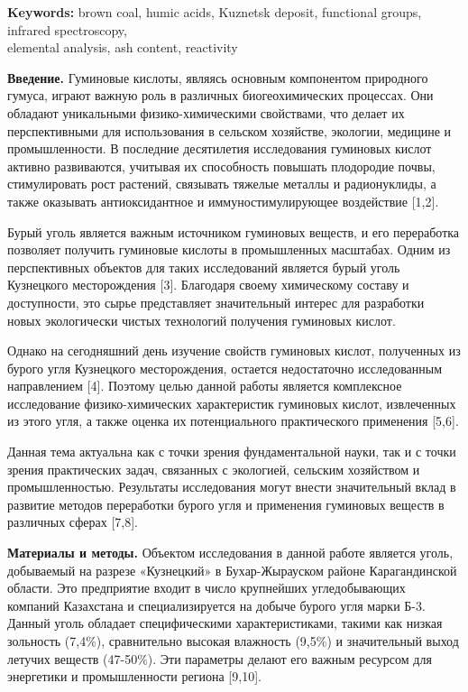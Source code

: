 {\bfseries Keywords:} brown coal, humic acids, Kuznetsk deposit, functional
groups, infrared spectroscopy, \\elemental analysis, ash content,
reactivity

\begin{multicols}{2}
{\bfseries Введение.} Гуминовые кислоты, являясь основным компонентом
природного гумуса, играют важную роль в различных биогеохимических
процессах. Они обладают уникальными физико-химическими свойствами, что
делает их перспективными для использования в сельском хозяйстве,
экологии, медицине и промышленности. В последние десятилетия
исследования гуминовых кислот активно развиваются, учитывая их
способность повышать плодородие почвы, стимулировать рост растений,
связывать тяжелые металлы и радионуклиды, а также оказывать
антиоксидантное и иммуностимулирующее воздействие {[}1,2{]}.

Бурый уголь является важным источником гуминовых веществ, и его
переработка позволяет получить гуминовые кислоты в промышленных
масштабах. Одним из перспективных объектов для таких исследований
является бурый уголь Кузнецкого месторождения {[}3{]}. Благодаря своему
химическому составу и доступности, это сырье представляет значительный
интерес для разработки новых экологически чистых технологий получения
гуминовых кислот.

Однако на сегодняшний день изучение свойств гуминовых кислот, полученных
из бурого угля Кузнецкого месторождения, остается недостаточно
исследованным направлением {[}4{]}. Поэтому целью данной работы является
комплексное исследование физико-химических характеристик гуминовых
кислот, извлеченных из этого угля, а также оценка их потенциального
практического применения {[}5,6{]}.

Данная тема актуальна как с точки зрения фундаментальной науки, так и с
точки зрения практических задач, связанных с экологией, сельским
хозяйством и промышленностью. Результаты исследования могут внести
значительный вклад в развитие методов переработки бурого угля и
применения гуминовых веществ в различных сферах {[}7,8{]}.

{\bfseries Материалы и методы.} Объектом исследования в данной работе
является уголь, добываемый на разрезе «Кузнецкий» в Бухар-Жырауском
районе Карагандинской области. Это предприятие входит в число крупнейших
угледобывающих компаний Казахстана и специализируется на добыче бурого
угля марки Б-3. Данный уголь обладает специфическими характеристиками,
такими как низкая зольность (7,4\%), сравнительно высокая влажность
(9,5\%) и значительный выход летучих веществ (47-50\%). Эти параметры
делают его важным ресурсом для энергетики и промышленности региона
{[}9,10{]}.


\end{multicols}

